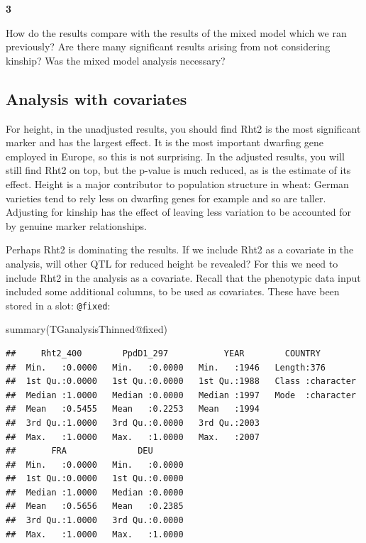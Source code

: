 \documentclass[
]{book}
\makeatletter
\newenvironment{Shaded}{\begin{snugshade}}{\end{snugshade}}
\newcommand{\FunctionTok}[1]{\textcolor[rgb]{0.00,0.00,0.00}{#1}}
\newcommand{\NormalTok}[1]{#1}
\newcommand{\SpecialCharTok}[1]{\textcolor[rgb]{0.00,0.00,0.00}{#1}}
\newenvironment{kframe}{%
\medskip{}
\setlength{\fboxsep}{.8em}
 \def\at@end@of@kframe{}%
 \ifinner\ifhmode%
  \def\at@end@of@kframe{\end{minipage}}%
  \begin{minipage}{\columnwidth}%
 \fi\fi%
 \def\FrameCommand##1{\hskip\@totalleftmargin \hskip-\fboxsep
 \colorbox{shadecolor}{##1}\hskip-\fboxsep
     \hskip-\linewidth \hskip-\@totalleftmargin \hskip\columnwidth}%
 \MakeFramed {\advance\hsize-\width
   \@totalleftmargin\z@ \linewidth\hsize
   \@setminipage}}%
 {\par\unskip\endMakeFramed%
 \at@end@of@kframe}
\newenvironment{rmdblock}[1]
  {
  \begin{itemize}
  \renewcommand{\labelitemi}{
    \raisebox{-.7\height}[0pt][0pt]{
      {\setkeys{Gin}{width=3em,keepaspectratio}\texttt{[image: images/\#1]}}
    }
  }
  \setlength{\fboxsep}{1em}
  \begin{kframe}
  \item
  }
  {
  \end{kframe}
  \end{itemize}
  }
\newenvironment{rmdquiz}
  {\begin{rmdblock}{quiz}}
  {\end{rmdblock}}
\makeatother
\begin{document}
\begin{rmdquiz}
\textbf{3}

How do the results compare with the results of the mixed model which we ran previously? Are there many significant results arising from not considering kinship? Was the mixed model analysis necessary?
\end{rmdquiz}

\hypertarget{analysis-with-covariates}{%
\subsection{Analysis with covariates}\label{analysis-with-covariates}}

For height, in the unadjusted results, you should find Rht2 is the most significant marker and has the largest effect. It is the most important dwarfing gene employed in Europe, so this is not surprising. In the adjusted results, you will still find Rht2 on top, but the p-value is much reduced, as is the estimate of its effect. Height is a major contributor to population structure in wheat: German varieties tend to rely less on dwarfing genes for example and so are taller. Adjusting for kinship has the effect of leaving less variation to be accounted for by genuine marker relationships.

Perhaps Rht2 is dominating the results. If we include Rht2 as a covariate in the analysis, will other QTL for reduced height be revealed? For this we need to include Rht2 in the analysis as a covariate. Recall that the phenotypic data input included some additional columns, to be used as covariates. These have been stored in a slot: \texttt{@fixed}:

\begin{Shaded}
\begin{Highlighting}[]
\FunctionTok{summary}\NormalTok{(TGanalysisThinned}\SpecialCharTok{@}\NormalTok{fixed) }
\end{Highlighting}
\end{Shaded}

\begin{verbatim}
##     Rht2_400        PpdD1_297           YEAR        COUNTRY         
##  Min.   :0.0000   Min.   :0.0000   Min.   :1946   Length:376        
##  1st Qu.:0.0000   1st Qu.:0.0000   1st Qu.:1988   Class :character  
##  Median :1.0000   Median :0.0000   Median :1997   Mode  :character  
##  Mean   :0.5455   Mean   :0.2253   Mean   :1994                     
##  3rd Qu.:1.0000   3rd Qu.:0.0000   3rd Qu.:2003                     
##  Max.   :1.0000   Max.   :1.0000   Max.   :2007                     
##       FRA              DEU        
##  Min.   :0.0000   Min.   :0.0000  
##  1st Qu.:0.0000   1st Qu.:0.0000  
##  Median :1.0000   Median :0.0000  
##  Mean   :0.5656   Mean   :0.2385  
##  3rd Qu.:1.0000   3rd Qu.:0.0000  
##  Max.   :1.0000   Max.   :1.0000
\end{verbatim}
\end{document}
